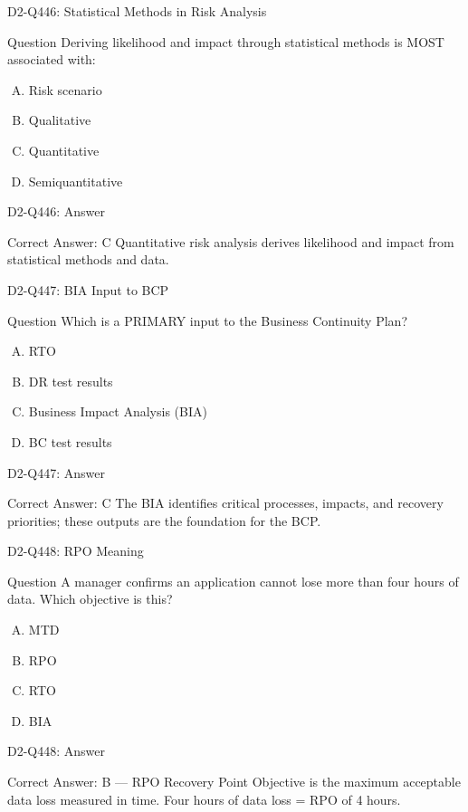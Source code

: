 \documentclass{beamer}
\begin{document}
\begin{frame}{D2-Q446: Statistical Methods in Risk Analysis}
	\begin{block}{Question}
		Deriving likelihood and impact through statistical methods is MOST associated with:
	\end{block}
	\begin{enumerate}[(A)]
		\item Risk scenario
		\item Qualitative
		\item Quantitative
		\item Semiquantitative
	\end{enumerate}
\end{frame}
\begin{frame}{D2-Q446: Answer}
	\begin{block}{Correct Answer: C}
		Quantitative risk analysis derives likelihood and impact from statistical methods and data.
	\end{block}
\end{frame}

\begin{frame}{D2-Q447: BIA Input to BCP}
	\begin{block}{Question}
		Which is a PRIMARY input to the Business Continuity Plan?
	\end{block}
	\begin{enumerate}[(A)]
		\item RTO
		\item DR test results
		\item Business Impact Analysis (BIA)
		\item BC test results
	\end{enumerate}
\end{frame}
\begin{frame}{D2-Q447: Answer}
	\begin{block}{Correct Answer: C}
		The BIA identifies critical processes, impacts, and recovery priorities; these outputs are the foundation for the BCP.
	\end{block}
\end{frame}

\begin{frame}{D2-Q448: RPO Meaning}
	\begin{block}{Question}
		A manager confirms an application cannot lose more than four hours of data. Which objective is this?
	\end{block}
	\begin{enumerate}[(A)]
		\item MTD
		\item RPO
		\item RTO
		\item BIA
	\end{enumerate}
\end{frame}
\begin{frame}{D2-Q448: Answer}
	\begin{block}{Correct Answer: B --- RPO}
		Recovery Point Objective is the maximum acceptable data loss measured in time. Four hours of data loss = RPO of 4 hours.
	\end{block}
\end{frame}
\end{document}
